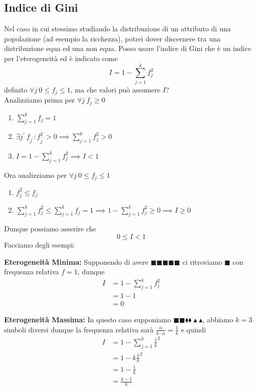 \documentclass[11pt]{report}
\begin{document}
\subsection{Indice di Gini}
Nel caso in cui stessimo studiando la distribuzione di un attributo di una popolazione (ad esempio la ricchezza), potrei dover discernere tra una distribuzione equa ed una non equa. Posso usare l'indice di Gini che è un indice per l'eterogeneità ed è indicato come
\begin{equation}
    I = 1 - \sum_{j=1}^{k}f_j^2
\end{equation}
definito $\forall j\ 0 \leq f_j \leq 1$, ma che valori può assumere $I$?\\
Analizziamo prima per $\forall j\ f_j \geq 0$
\begin{enumerate}
    \item $\sum_{j=1}^{k}f_j=1$
    \item $\exists j^{\prime}\ f_{j^{\prime}} : f_{j^{\prime}}^2 > 0 \implies \sum_{j=1}^{k}f_j^2 > 0$
    \item $I = 1 - \sum_{j=1}^{k}f_j^2 \implies I < 1$
\end{enumerate}
Ora analizziamo per $\forall j\ 0 \leq f_j \leq 1$
\begin{enumerate}
    \item $f_j^2 \leq f_j$
    \item $\sum_{j=1}^{k}f_j^2 \leq \sum_{j=1}^{k}f_j = 1 \implies 1 - \sum_{j=1}^{k}f_j^2 \geq 0 \implies I \geq 0$
\end{enumerate}
Dunque possiamo asserire che
$$0 \leq I < 1$$
Facciamo degli esempi:
\begin{description}
	\item \textbf{Eterogeneità Minima:} Supponendo di avere $\blacksquare \blacksquare \blacksquare \blacksquare \blacksquare$ ci ritroviamo $\blacksquare$ con frequenza relativa $f = 1$, dunque
    \begin{equation}
        \begin{split}
            I & = 1 - \sum_{j=1}^{k}f_j^2\\
            & = 1 - 1\\
            & = 0
        \end{split}
    \end{equation}
	\item \textbf{Eterogeneità Massima:} In questo caso supponiamo $\blacksquare \blacksquare \blacklozenge \blacklozenge \blacktriangle \blacktriangle$, abbiamo $k=3$ simboli diversi dunque la frequenza relativa sarà $\frac{\alpha}{k \cdot \alpha} = \frac{1}{k}$ e quindi
    \begin{equation}
        \begin{split}
            I & = 1 - \sum_{j=1}^{k}\frac{1}{k}^2\\
            & = 1 - k\frac{1}{k}^2\\
            & = 1 - \frac{1}{k}\\
            & = \frac{k - 1}{k}
        \end{split}
    \end{equation}
\end{description}
\end{document}
